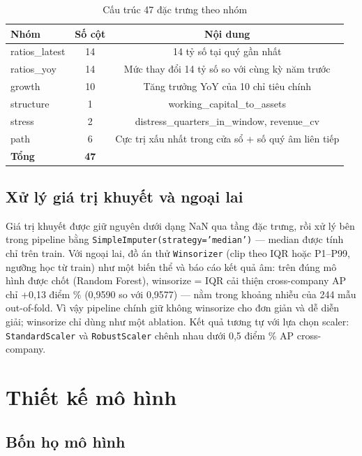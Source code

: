 \documentclass[13pt,a4paper]{extreport}
\begin{document}
\begin{table}[H]
\centering
\caption{Cấu trúc 47 đặc trưng theo nhóm}
\begin{center}
\small
\begin{tabular}{|l|c|c|}
\hline
\textbf{Nhóm} & \textbf{Số cột} & \textbf{Nội dung} \\ \hline
ratios\_latest & 14 & 14 tỷ số tại quý gần nhất \\ \hline
ratios\_yoy & 14 & Mức thay đổi 14 tỷ số so với cùng kỳ năm trước \\ \hline
growth & 10 & Tăng trưởng YoY của 10 chỉ tiêu chính \\ \hline
structure & 1 & working\_capital\_to\_assets \\ \hline
stress & 2 & distress\_quarters\_in\_window, revenue\_cv \\ \hline
path & 6 & Cực trị xấu nhất trong cửa sổ + số quý âm liên tiếp \\ \hline
\textbf{Tổng} & \textbf{47} &  \\ \hline
\end{tabular}
\end{center}
\end{table}

\subsection{Xử lý giá trị khuyết và ngoại lai}

Giá trị khuyết được giữ nguyên dưới dạng NaN qua tầng đặc trưng, rồi xử lý bên trong pipeline bằng \texttt{SimpleImputer(strategy='median')} — median được tính chỉ trên train. Với ngoại lai, đồ án thử \texttt{Winsorizer} (clip theo IQR hoặc P1–P99, ngưỡng học từ train) như một biến thể và báo cáo kết quả âm: trên đúng mô hình được chốt (Random Forest), winsorize = IQR cải thiện cross-company AP chỉ +0,13 điểm \% (0,9590 so với 0,9577) — nằm trong khoảng nhiễu của 244 mẫu out-of-fold. Vì vậy pipeline chính giữ không winsorize cho đơn giản và dễ diễn giải; winsorize chỉ dùng như một ablation. Kết quả tương tự với lựa chọn scaler: \texttt{StandardScaler} và \texttt{RobustScaler} chênh nhau dưới 0,5 điểm \% AP cross-company.

\clearpage

\section{Thiết kế mô hình}

\subsection{Bốn họ mô hình}
\end{document}
